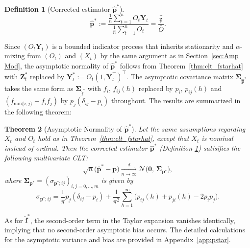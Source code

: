 ﻿\documentclass[12pt,a4paper]{scrreprt}
\newtheorem{theorem}{Theorem}[chapter]
\theoremstyle{definition}
\newtheorem{definition}[theorem]{Definition}
\begin{document}
\begin{definition}[Corrected estimator $\hat{\boldsymbol{p}}^*$]\label{def:p_starhat}
\[
    \hat{\boldsymbol{p}}^*
    := \frac{\frac{1}{n}\sum_{t=1}^n O_t \boldsymbol{Y}_t}
            {\frac{1}{n}\sum_{t=1}^n O_t}
    = \frac{\hat{\boldsymbol{\mathfrak{p}}}}{\bar{O}}.
\]
\end{definition}\noindent
Since $(O_t\boldsymbol{Y}_t)$ is a bounded indicator process that 
inherits stationarity and $\alpha$-mixing from $(O_t)$ and $(X_t)$ 
by the same argument as in Section~\ref{sec:Amp Mod}, the asymptotic 
normality of $\hat{\boldsymbol{p}}^*$ follows from 
Theorem~\ref{thm:clt_fstarhat} with $\boldsymbol{Z}_t^*$ replaced by 
$\boldsymbol{Y}_t^* := O_t(1, \boldsymbol{Y}_t^\top)^\top$. The 
asymptotic covariance matrix $\boldsymbol{\Sigma}_{\hat{\boldsymbol{p}}^*}$ 
takes the same form as \hyperref[thm:clt_fstarhat]{$\boldsymbol{\Sigma}_{\hat{\boldsymbol{f}}^*}$} with $f_i$, $f_{ij}(h)$ 
replaced by $p_i$, $p_{ij}(h)$ and $(f_{\mathrm{min}\{i,j\}}- f_i f_j)$ by $p_j(\delta_{ij} - p_i)$ throughout. 
The results are summarized in the following theorem: 
\begin{theorem}[Asymptotic Normality of $\hat{\boldsymbol{p}}^*$]
\label{thm:clt_pstarhat}
Let the same assumptions regarding $X_t$ and $O_t$ hold as in Theorem~\ref{thm:clt_fstarhat}, except that $X_t$ is nominal instead of ordinal. Then
the corrected estimator $\hat{\boldsymbol{p}}^*$ (Definition \ref{def:p_starhat}) satisifies the following multivariate CLT: 
\[
    \sqrt{n}\bigl(\hat{\boldsymbol{p}}^* - \boldsymbol{p}\bigr)
    \xrightarrow[n\to\infty]{d}
    \mathcal{N}\bigl(\boldsymbol{0},\, \boldsymbol{\Sigma}_{\boldsymbol{p}^*}\bigr),
\]
where $\boldsymbol{\Sigma}_{\boldsymbol{p}^*} = (\sigma_{\boldsymbol{p}^*;ij})_{i,j=0,\ldots,m}$ is
given by
\[
    \sigma_{\boldsymbol{p}^*;ij}
    =  \frac{1}{\pi}p_j(\delta_{ij} - p_i)
    + \frac{1}{\pi^2}\sum_{h=1}^{\infty}\bigl(p_{ij}(h) + p_{ji}(h) - 2p_i p_j\bigr).
\]
\end{theorem}
\noindent As for
\hyperref[thm:clt_fstarhat]{$\hat{\boldsymbol{f}}^*$},
the second-order term in the Taylor expansion vanishes identically, 
implying that no second-order asymptotic bias occurs. The detailed calculations 
for the asymptotic variance and bias are provided in Appendix~\ref{app:pstar}.
\end{document}
